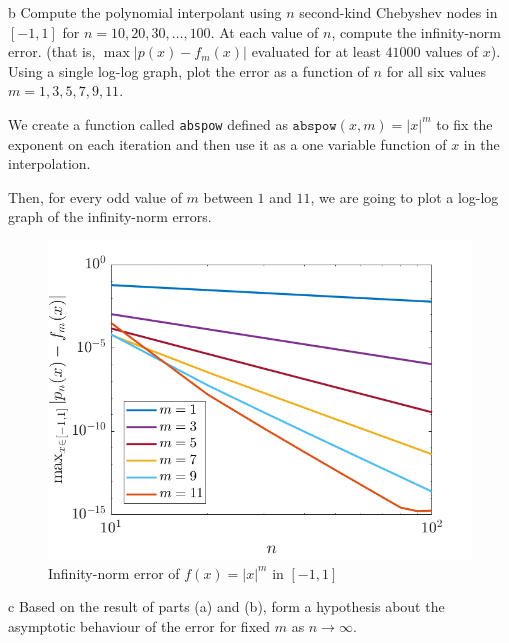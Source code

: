 \begin{statement}{b}
  Compute the polynomial interpolant using $n$ second-kind Chebyshev
  nodes in $[-1, 1]$ for $n = 10, 20, 30, \dots, 100$.
  At each value of $n$, compute the infinity-norm error.
  (that is, $\max|p(x) - f_m(x)|$ evaluated for at least $41000$ values of $x$).
  Using a single log-log graph, plot the error as a function of $n$ for all six values $m = 1, 3, 5, 7, 9, 11$.
\end{statement}

\begin{solution}
  We create a function called \texttt{abspow} defined as $\texttt{abspow}(x, m) = |x|^m$ to
  fix the exponent on each iteration and then use it as a one variable function of $x$ in the
  interpolation.
  
  Then, for every odd value of $m$ between $1$ and $11$, we are going to plot a log-log graph
  of the infinity-norm errors.
  
  \begin{figure}[H]
    \centering
    \includegraphics[scale=0.5]{graphics/plot-07-02.png}
    \caption{Infinity-norm error of $f(x) = |x|^m$ in $[-1, 1]$}
  \end{figure}
\end{solution}

\begin{statement}{c}
  Based on the result of parts (a) and (b), form a hypothesis about the asymptotic behaviour
  of the error for fixed $m$ as $n \to \infty$.
\end{statement}

